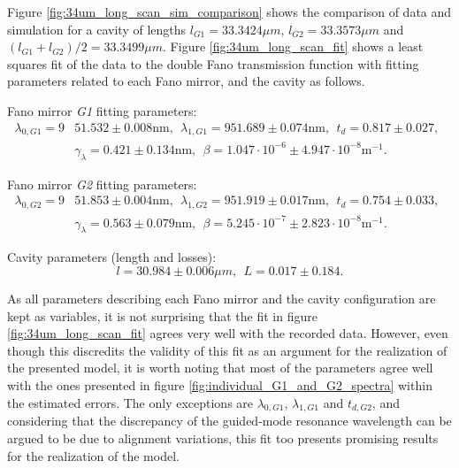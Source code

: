Figure \ref{fig:34um_long_scan_sim_comparison} shows the comparison of data and simulation for a cavity of lengths $l_{G1} = 33.3424 \mu m$, $l_{G2} = 33.3573 \mu m$ and $(l_{G1} + l_{G2})/2 = 33.3499 \mu m$. Figure \ref{fig:34um_long_scan_fit} shows a least squares fit of the data to the double Fano transmission function with fitting parameters related to each Fano mirror, and the cavity as follows.

Fano mirror \emph{G1} fitting parameters:
\begin{equation}
    \begin{split}
        \lambda_{0,G1} = 9&51.532 \pm 0.008 \text{nm}, \:\: \lambda_{1,G1} = 951.689 \pm 0.074 \text{nm}, \:\: t_d = 0.817 \pm 0.027, \:\: \\&\gamma_{\lambda} = 0.421 \pm 0.134 \text{nm}, \:\: \beta = 1.047 \cdot 10^{-6} \pm 4.947 \cdot 10^{-8} \text{m}^{-1}.
    \end{split}
\end{equation}

Fano mirror \emph{G2} fitting parameters:
\begin{equation}
    \begin{split}
        \lambda_{0,G2} = 9&51.853 \pm 0.004 \text{nm}, \:\: \lambda_{1,G2} = 951.919 \pm 0.017 \text{nm}, \:\: t_d = 0.754 \pm 0.033, \:\: \\&\gamma_{\lambda} = 0.563 \pm 0.079 \text{nm}, \:\: \beta = 5.245 \cdot 10^{-7} \pm 2.823 \cdot 10^{-8} \text{m}^{-1}.
    \end{split}
\end{equation}

Cavity parameters (length and losses):
\begin{equation}
    l = 30.984 \pm 0.006 \mu m, \:\: L = 0.017 \pm 0.184.
\end{equation}

As all parameters describing each Fano mirror and the cavity configuration are kept as variables, it is not surprising that the fit in figure \ref{fig:34um_long_scan_fit} agrees very well with the recorded data. However, even though this discredits the validity of this fit as an argument for the realization of the presented model, it is worth noting that most of the parameters agree well with the ones presented in figure \ref{fig:individual_G1_and_G2_spectra} within the estimated errors. The only exceptions are $\lambda_{0,G1}$, $\lambda_{1,G1}$ and $t_{d,G2}$, and considering that the discrepancy of the guided-mode resonance wavelength can be argued to be due to alignment variations, this fit too presents promising results for the realization of the model.

